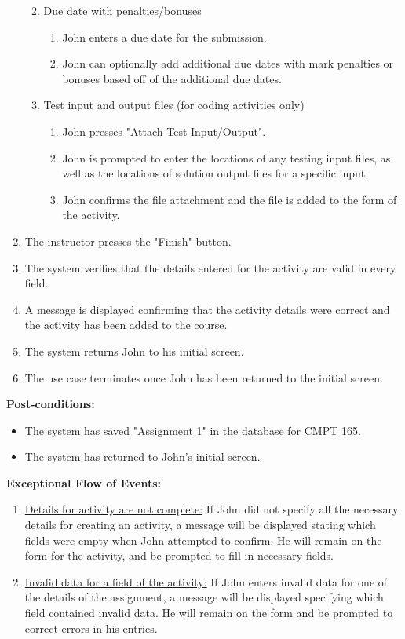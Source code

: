 \documentclass{article}
\begin{document}
\begin{enumerate}
\begin{enumerate}
\begin{enumerate}
		\end{enumerate}
		\item Due date with penalties/bonuses
			\begin{enumerate}
				\item John enters a due date for the submission.
				\item John can optionally add additional due dates with mark penalties or
					bonuses based off of the additional due dates.
			\end{enumerate}
		\item Test input and output files (for coding activities only)
			\begin{enumerate}
				\item John presses "Attach Test Input/Output".
				\item John is prompted to enter the locations of any testing input
					files, as well as the locations of solution output files for a specific
					input. 
				\item John confirms the file attachment and the file is added to the form of
					the activity.
			\end{enumerate}
	\end{enumerate}
	\item The instructor presses the "Finish" button.
	\item The system verifies that the details entered for the activity are valid in every field.
	\item A message is displayed confirming that the activity details were correct and the
		activity has been added to the course.
	\item The system returns John to his initial screen.
	\item The use case terminates once John has been returned to the initial
		screen.
\end{enumerate}
\textbf{Post-conditions:}
\begin{itemize}
	\item The system has saved "Assignment 1" in the database for CMPT 165.
	\item The system has returned to John's initial screen.
\end{itemize}
\textbf{Exceptional Flow of Events:}
\begin{enumerate}
	\item \underline{Details for activity are not complete:} If John did not specify
			all the necessary details for creating an activity, a message will be displayed
			stating which fields were empty when John attempted to confirm.
			He will remain on the form for the activity, and be prompted to fill in necessary
			fields.
	\item \underline{Invalid data for a field of the activity:} If John enters invalid
			data for one of the details of the assignment, a message will be displayed
			specifying which field contained invalid data. He will remain on the form and
			be prompted to correct errors in his entries.
\end{enumerate}
\end{document}
